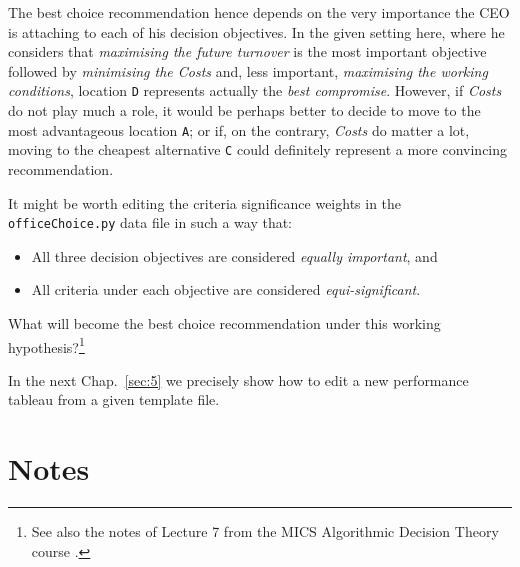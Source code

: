The best choice recommendation hence depends on the very importance the CEO is attaching to each of his decision objectives. In the given setting here, where he considers that \emph{maximising the future turnover} is the most important objective followed by \emph{minimising the Costs} and, less important, \emph{maximising the working conditions}, location \texttt{D} represents actually the \emph{best compromise}. However, if \emph{Costs} do not play much a role, it would be perhaps better to decide to move to the most advantageous location \texttt{A}; or if, on the contrary, \emph{Costs} do matter a lot, moving to the cheapest alternative \texttt{C} could definitely represent a more convincing recommendation. 

It might be worth editing the criteria significance weights in the\\
\texttt{officeChoice.py} data file in such a way that:
\begin{itemize}[topsep=2pt]
\item All three decision objectives are considered \emph{equally important}, and
\item All criteria under each objective are considered \emph{equi-significant}.
\end{itemize}

What will become the best choice recommendation under this working hypothesis?\footnote{See also the notes of Lecture 7 from the MICS Algorithmic Decision Theory course \citep{ADT-L7}.} 

\vspace{\baselineskip}
In the next Chap.~\ref{sec:5} we precisely show how to edit a new performance tableau from a given template file. 

{}
\section*{Notes}

